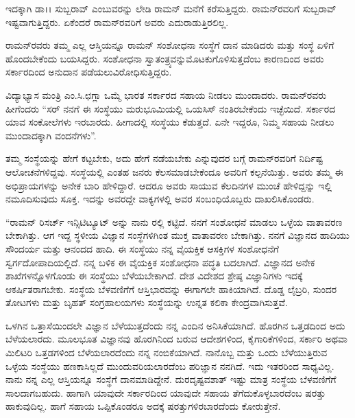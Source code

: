 ಇದಕ್ಕಾಗಿ ಡಾ।। ಸುಬ್ಬರಾವ್ ಎಂಬುವರನ್ನು ಲೇಡಿ ರಾಮನ್ ಮನೆಗೆ ಕರೆಸುತ್ತಿದ್ದರು. ರಾಮನ್‍\-ರವರಿಗೆ ಸುಬ್ಬರಾವ್ ಇಷ್ಟವಾಗುತ್ತಿದ್ದರು. ಏಕೆಂದರೆ ರಾಮನ್‍ರವರಿಗೆ ಅವರು ಎದುರಾಡುತ್ತಿರಲಿಲ್ಲ.



ರಾಮನ್‍ರವರು ತಮ್ಮ ಎಲ್ಲ ಆಸ್ತಿಯನ್ನೂ ರಾಮನ್ ಸಂಶೋಧನಾ ಸಂಸ್ಥೆಗೆ ದಾನ ಮಾಡಿದರು ಮತ್ತು ಸಂಸ್ಥೆ ಏಳಿಗೆ ಹೊಂದಬೇಕೆಂದು ಬಯಸಿದ್ದರು. ಸಂಶೋಧನಾ ಸ್ವಾತಂತ್ರ್ಯವನ್ನು\break ಮೊಟಕುಗೊಳಿಸುತ್ತದೆಂಬ ಕಾರಣದಿಂದ ಅವರು ಸರ್ಕಾರದಿಂದ ಅನುದಾನ ಪಡೆಯಲು\break ವಿರೋಧಿಸುತ್ತಿದ್ದರು.

ವಿದ್ಯಾಭ್ಯಾಸ ಮಂತ್ರಿ ಎಂ.ಸಿ.ಛಗ್ಲಾ ಒಮ್ಮೆ ಭಾರತ ಸರ್ಕಾರದ ಸಹಾಯ ನೀಡಲು ಮುಂದಾದರು. ರಾಮನ್‍ರವರು ಹೀಗೆಂದರು “ಸರ್ ನನಗೆ ಈ ಸಂಸ್ಥೆಯು ಮರುಭೂಮಿಯಲ್ಲಿ ಒಯಸಿಸ್ ನಂತಿರಬೇಕೆಂದು ಇಚ್ಛೆಯಿದೆ. ಸರ್ಕಾರದ ಯಾವ ಸಂಕೋಲೆಗಳು ಇರಬಾರದು. ಹೀಗಾದಲ್ಲಿ ಸಂಸ್ಥೆಯು ಕೆಡುತ್ತದೆ. ಏನೇ ಇದ್ದರೂ, ನಿಮ್ಮ ಸಹಾಯ ನೀಡಲು ಮುಂದಾದಕ್ಕಾಗಿ ವಂದನೆಗಳು”.

ತಮ್ಮ ಸಂಸ್ಥೆಯನ್ನು ಹೇಗೆ ಕಟ್ಟಬೇಕು, ಅದು ಹೇಗೆ ನಡೆಯಬೇಕು ಎನ್ನುವುದರ ಬಗ್ಗೆ ರಾಮನ್‍ರವರಿಗೆ ನಿರ್ದಿಷ್ಟ ಆಲೋಚನೆಗಳಿದ್ದವು. ಸಂಸ್ಥೆಯಲ್ಲಿ ಎಂತಹ ಜನರು ಕೆಲಸಮಾಡಬೇಕೆಂದೂ ಅವರಿಗೆ ಕಲ್ಪನೆಯಿತ್ತು. ಅವರು ತಮ್ಮ ಈ ಅಭಿಪ್ರಾಯಗಳನ್ನು ಅನೇಕ ಬಾರಿ ಹೇಳಿದ್ದಾರೆ. ಆದರೂ ಅವರು ಸಾಯುವ ಕೆಲದಿನಗಳ ಮುಂಚೆ ಹೇಳಿದ್ದನ್ನು ಇಲ್ಲಿ ನಮೂದಿಸುವುದು ಸೂಕ್ತ. ಇದನ್ನು ಅವರದ್ದೇ ವಾಕ್ಯಗಳಲ್ಲಿ ಅವರ ಸಂಬಂಧಿಯೊಬ್ಬರು ದಾಖಲಿಸಿಕೊಂಡರು.

“ರಾಮನ್ ರಿಸರ್ಚ್ ಇನ್ಸಿಟಿಟ್ಯೂಟ್ ಅನ್ನು ನಾನು ರಲ್ಲಿ ಕಟ್ಟಿದೆ. ನನಗೆ ಸಂಶೋಧನೆ ಮಾಡಲು ಒಳ್ಳೆಯ ವಾತಾವರಣ ಬೇಕಾಗಿತ್ತು. ಆಗ ಇದ್ದ ಸ್ಥಳೀಯ ವಿಜ್ಞಾನ ಸಂಸ್ಥೆಗಳಿಗಿಂತ ಮುಕ್ತ ವಾತಾವರಣ ಬೇಕಾಗಿತ್ತು. ನನಗೆ ವಿಜ್ಞಾನದ ಹಾದಿಯು ಸೌಂದರ್ಯ ಮತ್ತು ಆನಂದದ ಹಾದಿ. ಈ ಸಂಸ್ಥೆಯು ನನ್ನ ವೈಯಕ್ತಿಕ ಆಸಕ್ತಿಗಳ ಸಂಶೋಧನೆಗೆ ಸ್ವರ್ಗದೋಪಾದಿಯಲ್ಲಿದೆ. ನನ್ನ ಬಳಿಕ ಈ ವೈಯಕ್ತಿಕ ಸಂಶೋಧನಾ ಪದ್ಧತಿ ಬದಲಾಗಿದೆ. ವಿಜ್ಞಾನದ ಅನೇಕ ಶಾಖೆಗಳನ್ನೊಳಗೊಂಡು ಈ ಸಂಸ್ಥೆಯು ಬೆಳೆಯಬೇಕಾಗಿದೆ. ದೇಶ ವಿದೇಶದ ಶ್ರೇಷ್ಠ ವಿಜ್ಞಾನಿಗಳು ಇದಕ್ಕೆ ಆಕರ್ಷಿತರಾಗಬೇಕು. ಸಂಸ್ಥೆಯ ಬೆಳವಣಿಗೆಗೆ ಆಸ್ತಿಭಾರವನ್ನು ಈಗಾಗಲೇ ಹಾಕಿಯಾಗಿದೆ. ದೊಡ್ಡ ಲೈಬ್ರರಿ, ಸುಂದರ ತೋಟಗಳು ಮತ್ತು ಬೃಹತ್ ಸಂಗ್ರಹಾಲಯಗಳು ಸಂಸ್ಥೆಯನ್ನು ಉನ್ನತ ಕಲಿಕಾ ಕೇಂದ್ರವಾಗಿಸುತ್ತವೆ.

ಒಳಗಿನ ಒತ್ತಾಸೆಯಿಂದಲೇ ವಿಜ್ಞಾನ ಬೆಳೆಯುತ್ತದೆಂದು ನನ್ನ ಎಂದಿನ ಅನಿಸಿಕೆಯಾಗಿದೆ. ಹೊರಗಿನ ಒತ್ತಡದಿಂದ ಅದು ಬೆಳೆಯಲಾರದು. ಮೂಲಭೂತ ವಿಜ್ಞಾನವು ಹೊರಗಿನಿಂದ ಬರುವ ಆದೇಶಗಳಿಂದ, ಕೈಗಾರಿಕೆಗಳಿಂದ, ಸರ್ಕಾರಿ ಅಥವಾ ಮಿಲಿಟರಿ ಒತ್ತಡಗಳಿಂದ ಬೆಳೆಯಲಾರದೆಂದು ನನ್ನ ನಂಬಿಕೆಯಾಗಿದೆ. ನಾನೊಬ್ಬ  ಮತ್ತು ಒಂದು ಬೆಳೆಯುತ್ತಿರುವ ಒಳ್ಳೆಯ ಸಂಸ್ಥೆಯು ಹಣಕಾಸಿಲ್ಲದೆ ಮುಂದುವರಿಯಲಾರದೆಂಬ ಪರಿಜ್ಞಾನ ನನಗಿದೆ. ಇದು ಇತರರಿಂದ ಸಾಧ್ಯವಿಲ್ಲ. ನಾನು ನನ್ನ ಎಲ್ಲ ಆಸ್ತಿಯನ್ನೂ ಸಂಸ್ಥೆಗೆ ದಾನಮಾಡಿದ್ದೇನೆ. ದುರದೃಷ್ಟವಶಾತ್ ಇಷ್ಟು ಮಾತ್ರ ಸಂಸ್ಥೆಯ ಬೆಳವಣಿಗೆಗೆ ಸಾಲದಾಗಬಹುದು. ಹಾಗಾಗಿ ಯಾವುದೇ ಸರ್ಕಾರದಿಂದ ಯಾವುದೇ ಸಹಾಯ ತೆಗೆದುಕೊಳ್ಳಬಾರದೆಂಬ ಷರತ್ತು ಹಾಕುವುದಿಲ್ಲ. ಹಾಗೆ ಸಹಾಯ ಒಪ್ಪಿಕೊಂಡರೂ ಅದಕ್ಕೆ ಷರತ್ತುಗಳಿರಬಾರದೆಂದು ಕೋರುತ್ತೇನೆ.

